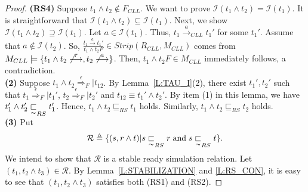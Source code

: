 \documentclass{elsarticle}
\theoremstyle{plain}
\theoremstyle{definition}
\begin{document}
\begin{proof}
    \textbf{(RS4)} Suppose $t_1 \wedge t_2 \notin F_{{CLL}}$. We want to prove ${\mathcal I}(t_1 \wedge t_2) = {\mathcal I}(t_1)$.
    It is straightforward that ${\mathcal I}(t_1 \wedge t_2) \subseteq {\mathcal I}(t_1)$.
    Next, we show ${\mathcal I}(t_1 \wedge t_2) \supseteq {\mathcal I}(t_1)$.
    Let $a \in {\mathcal I}(t_1)$.
    Thus, $t_1 \stackrel{a}{\longrightarrow}_{{CLL}}t_1'$ for some $t_1'$.
    Assume that $a \notin {\mathcal I}(t_2)$. So, $ \frac{t_1 \stackrel{a}{\longrightarrow}t_1'}{t_1 \wedge t_2F} \in Strip(R_{CLL},M_{{CLL}})$ comes from $M_{{CLL}} \models \{t_1 \wedge t_2 \not\stackrel{\tau}{\longrightarrow},t_2 \not\stackrel{a}{\longrightarrow}\}$.
    Then, $t_1 \wedge t_2F \in M_{{CLL}}$ immediately follows, a contradiction. \\

\noindent \textbf{(2)}
  Suppose $t_1 \wedge t_2 \stackrel{\epsilon}{\Longrightarrow}_F| t_{12}$. By Lemma~\ref{L:TAU_I}(2), there exist $t_1',t_2'$ such that  $t_1 \stackrel{\epsilon}{\Longrightarrow}_F| t_1'$, $t_2 \stackrel{\epsilon}{\Longrightarrow}_F| t_2'$ and $t_{12} \equiv t_1' \wedge t_2'$.
  By item (1) in this lemma, we have $ t_1'  \wedge t_2' \underset{\thicksim}{\sqsubset}_{RS} t_1'$. Hence, $t_1 \wedge t_2 \sqsubseteq_{RS} t_1$ holds. Similarly, $t_1 \wedge t_2 \sqsubseteq_{RS} t_2$ holds.\\


\noindent \textbf{(3)} Put
        \[{\mathcal R}\triangleq\{(s, r \wedge t )| s \underset{\thicksim}{\sqsubset}_{RS} r\;\text{and}\; s \underset{\thicksim}{\sqsubset}_{RS} t\}.\]
We intend to show that $\mathcal R$ is a stable ready simulation relation. Let $(t_1, t_2 \wedge t_3 ) \in {\mathcal R}$.
    By Lemma~\ref{L:STABILIZATION} and \ref{L:RS_CON}, it is easy to see that $(t_1, t_2 \wedge t_3 )$ satisfies both (RS1) and (RS2).


\end{proof}
\end{document}
